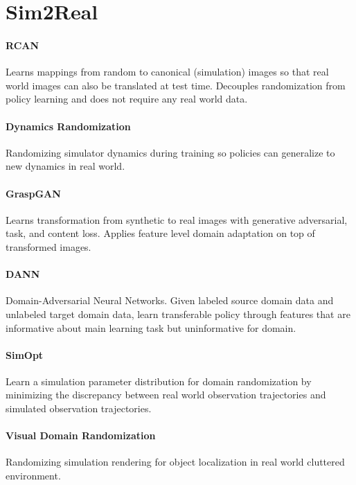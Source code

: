 \section{Sim2Real}

\paragraph{RCAN~\citep{james2018simtoreal}}
Learns mappings from random to canonical (simulation) images so that real world images can also be translated at test time.  Decouples randomization from policy learning and does not require any real world data. 

\paragraph{Dynamics Randomization~\citep{Peng_2018}}
Randomizing simulator dynamics during training so policies can generalize to new dynamics in real world.

\paragraph{GraspGAN~\citep{bousmalis2017using}}
Learns transformation from synthetic to real images with generative adversarial, task, and content loss.  Applies feature level domain adaptation on top of transformed images.

\paragraph{DANN~\citep{ganin2015domainadversarial}}
Domain-Adversarial Neural Networks.  Given labeled source domain data and unlabeled target domain data, learn transferable policy through features that are informative about main learning task but uninformative for domain.

\paragraph{SimOpt~\citep{chebotar2018closing}}
Learn a simulation parameter distribution for domain randomization by minimizing the discrepancy between real world observation trajectories and simulated observation trajectories.

\paragraph{Visual Domain Randomization~\citep{tobin2017domain}}
Randomizing simulation rendering for object localization in real world cluttered environment.

